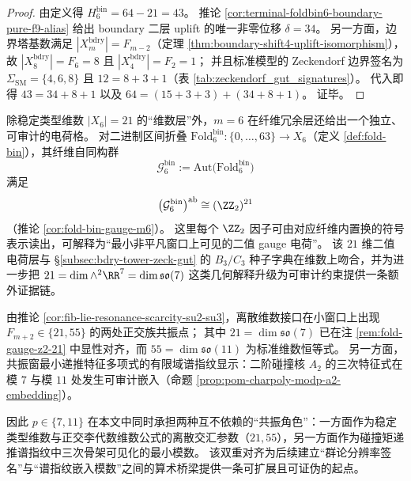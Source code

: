 \begin{proof}
由定义得 \(H^{\mathrm{bin}}_6=64-21=43\)。
推论 \ref{cor:terminal-foldbin6-boundary-pure-f9-alias} 给出 boundary 二层 uplift 的唯一非零位移 \(\delta=34\)。
另一方面，边界塔基数满足 \(|X_m^{\mathrm{bdry}}|=F_{m-2}\)（定理 \ref{thm:boundary-shift4-uplift-isomorphism}），故
\(|X_8^{\mathrm{bdry}}|=F_6=8\) 且 \(|X_4^{\mathrm{bdry}}|=F_2=1\)；
并且标准模型的 Zeckendorf 边界签名为 \(\Sigma_{\mathrm{SM}}=\{4,6,8\}\) 且 \(12=8+3+1\)（表 \ref{tab:zeckendorf_gut_signatures}）。
代入即得
\(
43=34+8+1
\)
以及
\(
64=(15+3+3)+(34+8+1)
\)。
证毕。
\end{proof}

\begin{remark}[fold-gauge 的 \texorpdfstring{$(\ZZ_2)^{21}$}{(Z2)^21} 二值电荷层（\texorpdfstring{$m=6$}{m=6}，dyadic 读出）]\label{rem:fold-gauge-z2-21}
除稳定类型维数 \(|X_6|=21\) 的“维数层”外，\(m=6\) 在纤维冗余层还给出一个独立、可审计的电荷格。
对二进制区间折叠 \(\mathrm{Fold}^{\mathrm{bin}}_6:\{0,\dots,63\}\to X_6\)（定义 \ref{def:fold-bin}），其纤维自同构群
\[
\mathcal{G}^{\mathrm{bin}}_6:=\mathrm{Aut}\!\bigl(\mathrm{Fold}^{\mathrm{bin}}_6\bigr)
\]
满足
\[
\bigl(\mathcal{G}^{\mathrm{bin}}_6\bigr)^{\mathrm{ab}}\cong (\ZZ_2)^{21}
\]
（推论 \ref{cor:fold-bin-gauge-m6}）。
这里每个 \(\ZZ_2\) 因子可由对应纤维内置换的符号表示读出，可解释为“最小非平凡窗口上可见的二值 gauge 电荷”。
该 \(21\) 维二值电荷层与 \S\ref{subsec:bdry-tower-zeck-gut} 的 \(B_3/C_3\) 种子字典在维数上吻合，并为进一步把
\(
21=\dim\wedge^2\RR^7=\dim\mathfrak{so}(7)
\)
这类几何解释升级为可审计约束提供一条额外证据链。
\end{remark}

\begin{remark}\label{rem:fib-lie-primes-7-11-double-alignment}
由推论 \ref{cor:fib-lie-resonance-scarcity-su2-su3}，离散维数接口在小窗口上出现 \(F_{m+2}\in\{21,55\}\) 的两处正交族共振点；
其中 \(21=\dim\mathfrak{so}(7)\) 已在注 \ref{rem:fold-gauge-z2-21} 中显性对齐，而 \(55=\dim\mathfrak{so}(11)\) 为标准维数恒等式。
另一方面，共振窗最小递推特征多项式的有限域谱指纹显示：二阶碰撞核 \(A_2\) 的三次特征式在模 \(7\) 与模 \(11\) 处发生可审计嵌入（命题 \ref{prop:pom-charpoly-modp-a2-embedding}）。
\par
因此 \(p\in\{7,11\}\) 在本文中同时承担两种互不依赖的“共振角色”：一方面作为稳定类型维数与正交李代数维数公式的离散交汇参数（\(21,55\)），另一方面作为碰撞矩递推谱指纹中三次骨架可见化的最小模数。
该双重对齐为后续建立“群论分辨率签名”与“谱指纹嵌入模数”之间的算术桥梁提供一条可扩展且可证伪的起点。
\end{remark}
